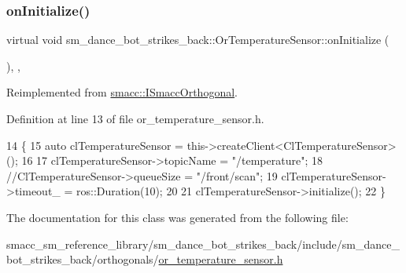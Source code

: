 \subsubsection{\texorpdfstring{on\+Initialize()}{onInitialize()}}
{\footnotesize\ttfamily virtual void sm\+\_\+dance\+\_\+bot\+\_\+strikes\+\_\+back\+::\+Or\+Temperature\+Sensor\+::on\+Initialize (\begin{DoxyParamCaption}{ }\end{DoxyParamCaption})\hspace{0.3cm}{\ttfamily [inline]}, {\ttfamily [override]}, {\ttfamily [virtual]}}



Reimplemented from \hyperlink{classsmacc_1_1ISmaccOrthogonal_a6bb31c620cb64dd7b8417f8705c79c7a}{smacc\+::\+I\+Smacc\+Orthogonal}.



Definition at line 13 of file or\+\_\+temperature\+\_\+sensor.\+h.


\begin{DoxyCode}
14     \{
15         \textcolor{keyword}{auto} clTemperatureSensor = this->createClient<ClTemperatureSensor>();
16 
17         clTemperatureSensor->topicName = \textcolor{stringliteral}{"/temperature"};
18         \textcolor{comment}{//ClTemperatureSensor->queueSize = "/front/scan";}
19         clTemperatureSensor->timeout\_ = ros::Duration(10);
20 
21         clTemperatureSensor->initialize();
22     \}
\end{DoxyCode}


The documentation for this class was generated from the following file\+:\begin{DoxyCompactItemize}
\item 
smacc\+\_\+sm\+\_\+reference\+\_\+library/sm\+\_\+dance\+\_\+bot\+\_\+strikes\+\_\+back/include/sm\+\_\+dance\+\_\+bot\+\_\+strikes\+\_\+back/orthogonals/\hyperlink{strikes__back_2include_2sm__dance__bot__strikes__back_2orthogonals_2or__temperature__sensor_8h}{or\+\_\+temperature\+\_\+sensor.\+h}\end{DoxyCompactItemize}
